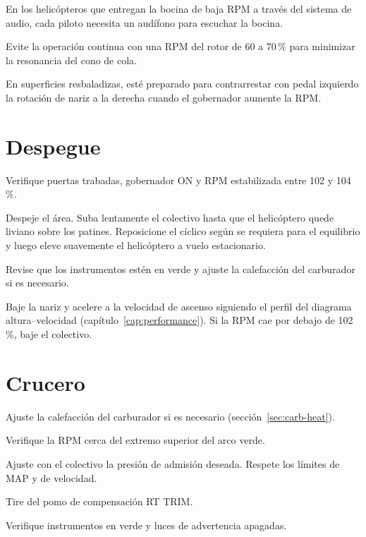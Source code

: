 \begin{precaucion}
En los helicópteros que entregan la bocina de baja RPM a través del sistema de audio, cada piloto necesita un audífono para escuchar la bocina.
\end{precaucion}

\begin{precaucion}
Evite la operación continua con una RPM del rotor de 60 a 70\,\% para minimizar la resonancia del cono de cola.
\end{precaucion}

\begin{precaucion}
En superficies resbaladizas, esté preparado para contrarrestar con pedal izquierdo la rotación de nariz a la derecha cuando el gobernador aumente la RPM.
\end{precaucion}

\section{Despegue}

\begin{pasos}
\item Verifique puertas trabadas, gobernador ON y RPM estabilizada entre 102 y 104\,\%.
\item Despeje el área. Suba lentamente el colectivo hasta que el helicóptero quede liviano sobre los patines. Reposicione el cíclico según se requiera para el equilibrio y luego eleve suavemente el helicóptero a vuelo estacionario.
\item Revise que los instrumentos estén en verde y ajuste la calefacción del carburador si es necesario.
\item Baje la nariz y acelere a la velocidad de ascenso siguiendo el perfil del diagrama altura--velocidad (capítulo~\ref{cap:performance}). Si la RPM cae por debajo de 102\,\%, baje el colectivo.
\end{pasos}

\section{Crucero}

\begin{pasos}
\item Ajuste la calefacción del carburador si es necesario (sección~\ref{sec:carb-heat}).
\item Verifique la RPM cerca del extremo superior del arco verde.
\item Ajuste con el colectivo la presión de admisión deseada. Respete los límites de MAP y de velocidad.
\item Tire del pomo de compensación \textsf{RT TRIM}.
\item Verifique instrumentos en verde y luces de advertencia apagadas.
\end{pasos}

